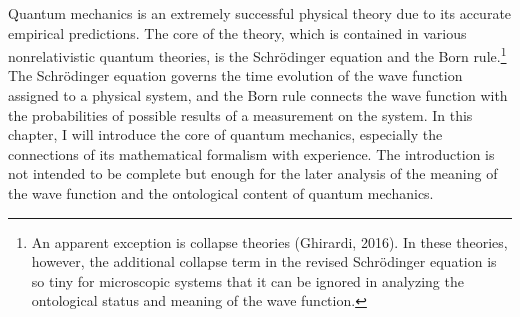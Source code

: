 


Quantum mechanics is an extremely successful physical theory due to its accurate empirical predictions.
The core of the theory, which is contained in various nonrelativistic quantum theories, is the Schr\"{o}dinger equation and the Born rule.\footnote{An apparent exception is collapse theories (Ghirardi, 2016). In these theories, however, the additional collapse term in the revised Schr\"{o}dinger equation is so tiny for microscopic systems that it can be ignored in analyzing the ontological status and meaning of the wave function.} The Schr\"{o}dinger equation governs the time evolution of the wave function assigned to a physical system, and the Born rule connects the wave function with the probabilities of possible results of a measurement on the system. %
In this chapter, I will introduce the core of quantum mechanics, especially the connections of its mathematical formalism with experience. The introduction is not intended to be complete but enough for the later analysis of the meaning of the wave function and the ontological content of quantum mechanics.

